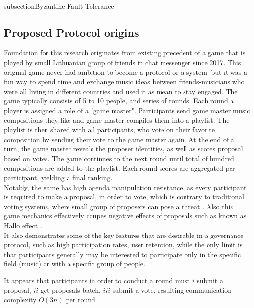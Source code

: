\documentclass{article}
\begin{document}
\begin{CJK}{UTF8}{gbsn}
\begin{multicols}{2}
\\subsection{Byzantine Fault Tolerance}




\subsection{Proposed Protocol origins}\label{sec:protocol_origins}
Foundation for this research originates from existing precedent of a game that is played by small Lithuanian group of friends in chat messenger since 2017. This original game never had ambition to become a protocol or a system, but it was a fun way to spend time and exchange music ideas between friends-musicians who were all living in different countries and used it as mean to stay engaged. The game typically consists of 5 to 10 people, and series of rounds. Each round a player is assigned a role of a "game master". Participants send game master music compositions they like and game master compiles them into a playlist. The playlist is then shared with all participants, who vote on their favorite composition by sending their vote to the game master again. At the end of a turn, the game master reveals the proposer identities, as well as scores proposal based on votes. The game continues to the next round until total of hundred compositions are added to the playlist. Each round scores are aggregated per participant, yielding a final ranking.\\
Notably, the game has high agenda manipulation resistance, as every participant is required to make a proposal, in order to vote, which is contrary to traditional voting systems, where small group of proposers can pose a threat  \cite{McKelvey1976}. Also this game mechanics effectively coupes negative effects of proposals such as known as Hallo effect \cite{Verhulst2010}. \\
It also demonstrates some of the key features that are desirable in a governance protocol, such as high participation rates, user retention, while the only limit is that participants generally may be interested to participate only in the specific field (music) or with a specific group of people.

It appears that participants in order to conduct a round must \(i\) submit a proposal, \(ii\) get proposals batch, \(iii\) submit a vote, resulting communication complexity $O(3n)$ per round



\end{multicols}
\end{CJK}
\end{document}
